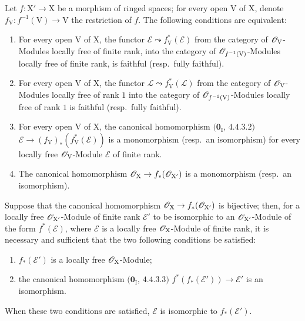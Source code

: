 \begin{lemma}[21.13.2]
\label{IV.21.13.2}
Let $f:\mathrm{X}'\to\mathrm{X}$ be a morphism of ringed spaces; for every open $\mathrm{V}$ of $\mathrm{X}$, denote $f_{\mathrm{V}}:f^{-1}(\mathrm{V})\to\mathrm{V}$ the restriction of $f$.
The following conditions are equivalent:
\begin{enumerate}[label=\emph{\alph*)}]
  \item For every open $\mathrm{V}$ of $\mathrm{X}$, the functor $\mathscr{E}\leadsto f_{\mathrm{V}}^*(\mathscr{E})$ from the category of $\mathscr{O}_{\mathrm{V}}$-Modules locally free of finite rank, into the category of $\mathscr{O}_{f^{-1}(\mathrm{V})}$-Modules locally free of finite rank, is faithful \textup{(resp.}\ fully faithful\textup{)}.
  \item[\emph{a')}] For every open $\mathrm{V}$ of $\mathrm{X}$, the functor $\mathscr{L}\leadsto f_{\mathrm{V}}^*(\mathscr{L})$ from the category of $\mathscr{O}_{\mathrm{V}}$-Modules locally free of rank $1$ into the category of $\mathscr{O}_{f^{-1}(\mathrm{V})}$-Modules locally free of rank $1$ is faithful \textup{(resp.}\ fully faithful\textup{)}.
  \item For every open $\mathrm{V}$ of $\mathrm{X}$, the canonical homomorphism $(\mathbf{0}_{\mathrm{I}}$, $4.4.3.2)$ $\mathscr{E}\to(f_{\mathrm{V}})_*(f_{\mathrm{V}}^*(\mathscr{E}))$ is a monomorphism \textup{(resp.}\ an isomorphism\textup{)} for every locally free $\mathscr{O}_{\mathrm{V}}$-Module $\mathscr{E}$ of finite rank.
  \item[\emph{b')}] The canonical homomorphism $\mathscr{O}_{\mathrm{X}}\to f_*(\mathscr{O}_{\mathrm{X}'})$ is a monomorphism \textup{(resp.}\ an isomorphism\textup{)}.
\end{enumerate}

Suppose that the canonical homomorphism $\mathscr{O}_{\mathrm{X}}\to f_*(\mathscr{O}_{\mathrm{X}'})$ is bijective; then, for a locally free $\mathscr{O}_{\mathrm{X}'}$-Module of finite rank $\mathscr{E}'$ to be isomorphic to an $\mathscr{O}_{\mathrm{X}'}$-Module of the form $f^*(\mathscr{E})$, where $\mathscr{E}$ is a locally free $\mathscr{O}_{\mathrm{X}}$-Module of finite rank, it is necessary and sufficient that the two following conditions be satisfied:
\begin{enumerate}[label=\textup{(\roman*)}]
  \item $f_*(\mathscr{E}')$ is a locally free $\mathscr{O}_{\mathrm{X}}$-Module;
  \item the canonical homomorphism $(\mathbf{0}_{\mathrm{I}}$, $4.4.3.3)$ $f^*(f_*(\mathscr{E}'))\to\mathscr{E}'$ is an isomorphism.
\end{enumerate}

When these two conditions are satisfied, $\mathscr{E}$ is isomorphic to $f_*(\mathscr{E}')$.
\end{lemma}

